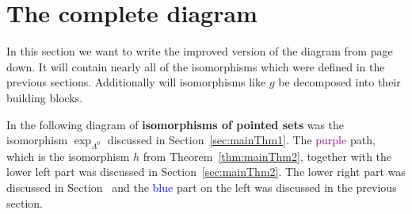 \pagebreak %
\section{The complete diagram}\label{sec:theCompleteDiagram}
In this section we want to write the improved version of the diagram from
page~\pageref{page:ofPreDiagram} down. It will contain nearly all of the
isomorphisms which were defined in the previous sections. Additionally will
isomorphisms like $g$ be decomposed into their building blocks.

In the following diagram of \textbf{isomorphisms of pointed sets} was the
isomorphism $\exp_{A^0}$ discussed in Section~\ref{sec:mainThm1}. The
\textcolor{purple}{purple} path, which is the isomorphism $h$ from
Theorem~\ref{thm:mainThm2}, together with the lower left part was discussed
in Section~\ref{sec:mainThm2}. The lower right part was discussed in
Section~\label{sec:furtherImprovements} and the \textcolor{blue}{blue} part on
the left was discussed in the previous section.
